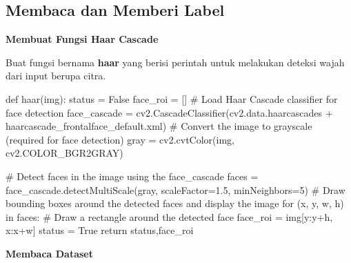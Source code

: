 \documentclass[
  letterpaper,
  DIV=11,
  numbers=noendperiod]{scrreprt}
\newenvironment{Shaded}{\begin{snugshade}}{\end{snugshade}}
\newcommand{\CommentTok}[1]{\textcolor[rgb]{0.37,0.37,0.37}{#1}}
\newcommand{\ControlFlowTok}[1]{\textcolor[rgb]{0.00,0.23,0.31}{#1}}
\newcommand{\DecValTok}[1]{\textcolor[rgb]{0.68,0.00,0.00}{#1}}
\newcommand{\FloatTok}[1]{\textcolor[rgb]{0.68,0.00,0.00}{#1}}
\newcommand{\KeywordTok}[1]{\textcolor[rgb]{0.00,0.23,0.31}{#1}}
\newcommand{\NormalTok}[1]{\textcolor[rgb]{0.00,0.23,0.31}{#1}}
\newcommand{\OperatorTok}[1]{\textcolor[rgb]{0.37,0.37,0.37}{#1}}
\newcommand{\StringTok}[1]{\textcolor[rgb]{0.13,0.47,0.30}{#1}}
\newcommand{\VariableTok}[1]{\textcolor[rgb]{0.07,0.07,0.07}{#1}}
\begin{document}

\hypertarget{membaca-dan-memberi-label}{%
\subsection*{Membaca dan Memberi
Label}\label{membaca-dan-memberi-label}}

\textbf{Membuat Fungsi Haar Cascade}

Buat fungsi bernama \textbf{haar} yang berisi perintah untuk melakukan
deteksi wajah dari input berupa citra.

\begin{Shaded}
\begin{Highlighting}[]
\KeywordTok{def}\NormalTok{ haar(img):}
\NormalTok{    status }\OperatorTok{=} \VariableTok{False}
\NormalTok{    face\_roi }\OperatorTok{=}\NormalTok{ []}
    \CommentTok{\# Load Haar Cascade classifier for face detection}
\NormalTok{    face\_cascade }\OperatorTok{=}\NormalTok{ cv2.CascadeClassifier(cv2.data.haarcascades }\OperatorTok{+} \StringTok{\textquotesingle{}haarcascade\_frontalface\_default.xml\textquotesingle{}}\NormalTok{)}
    \CommentTok{\# Convert the image to grayscale (required for face detection)}
\NormalTok{    gray }\OperatorTok{=}\NormalTok{ cv2.cvtColor(img, cv2.COLOR\_BGR2GRAY)}

    \CommentTok{\# Detect faces in the image using the face\_cascade}
\NormalTok{    faces }\OperatorTok{=}\NormalTok{ face\_cascade.detectMultiScale(gray, scaleFactor}\OperatorTok{=}\FloatTok{1.5}\NormalTok{, minNeighbors}\OperatorTok{=}\DecValTok{5}\NormalTok{)}
    \CommentTok{\# Draw bounding boxes around the detected faces and display the image}
    \ControlFlowTok{for}\NormalTok{ (x, y, w, h) }\KeywordTok{in}\NormalTok{ faces:}
        \CommentTok{\# Draw a rectangle around the detected face}
\NormalTok{        face\_roi }\OperatorTok{=}\NormalTok{ img[y:y}\OperatorTok{+}\NormalTok{h, x:x}\OperatorTok{+}\NormalTok{w]}
\NormalTok{        status }\OperatorTok{=} \VariableTok{True}
    \ControlFlowTok{return}\NormalTok{ status,face\_roi}
\end{Highlighting}
\end{Shaded}

\textbf{Membaca Dataset}
\end{document}
